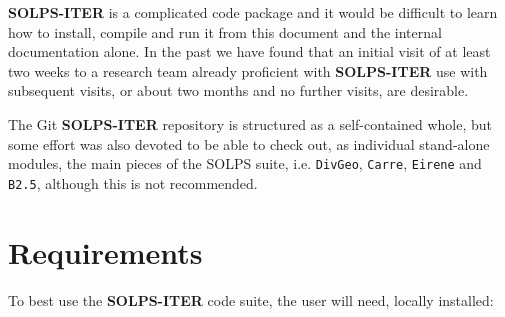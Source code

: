 \documentclass[a4paper,10pt]{report}
\newcommand\SOLPSITER{{\bf SOLPS-ITER} }
\begin{document}
\SOLPSITER is a complicated code package and it would be difficult to learn how to install, compile and run it from this document and the internal documentation alone.  In the past we have found that an initial visit of at least two weeks to a research team already proficient with \SOLPSITER use with subsequent visits, or about two months and no further visits, are desirable.

The Git \SOLPSITER repository is structured as a self-contained whole, but some effort was also devoted to be able to check out, as individual stand-alone modules, the main pieces of the SOLPS suite, i.e. {\tt DivGeo}, {\tt Carre}, {\tt Eirene} and {\tt B2.5}, although this is not recommended.

\section{Requirements}

To best use the \SOLPSITER code suite, the user will need, locally installed:
\end{document}
